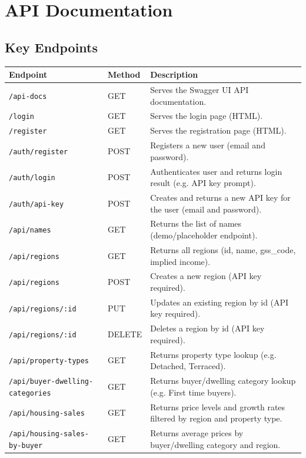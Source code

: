 \documentclass[11pt,a4paper]{article}
\begin{document}
\section{API Documentation}

\subsection{Key Endpoints}

\begin{center}
\begin{tabularx}{\textwidth}{@{}llX@{}}
\toprule
\textbf{Endpoint} & \textbf{Method} & \textbf{Description} \\
\midrule
\texttt{/api-docs} & GET & Serves the Swagger UI API documentation. \\
\texttt{/login} & GET & Serves the login page (HTML). \\
\texttt{/register} & GET & Serves the registration page (HTML). \\
\texttt{/auth/register} & POST & Registers a new user (email and password). \\
\texttt{/auth/login} & POST & Authenticates user and returns login result (e.g. API key prompt). \\
\texttt{/auth/api-key} & POST & Creates and returns a new API key for the user (email and password). \\
\texttt{/api/names} & GET & Returns the list of names (demo/placeholder endpoint). \\
\texttt{/api/regions} & GET & Returns all regions (id, name, gss\_code, implied income). \\
\texttt{/api/regions} & POST & Creates a new region (API key required). \\
\texttt{/api/regions/:id} & PUT & Updates an existing region by id (API key required). \\
\texttt{/api/regions/:id} & DELETE & Deletes a region by id (API key required). \\
\texttt{/api/property-types} & GET & Returns property type lookup (e.g. Detached, Terraced). \\
\texttt{/api/buyer-dwelling-categories} & GET & Returns buyer/dwelling category lookup (e.g. First time buyers). \\
\texttt{/api/housing-sales} & GET & Returns price levels and growth rates filtered by region and property type. \\
\texttt{/api/housing-sales-by-buyer} & GET & Returns average prices by buyer/dwelling category and region. \\

\end{tabularx}
\end{center}
\end{document}
